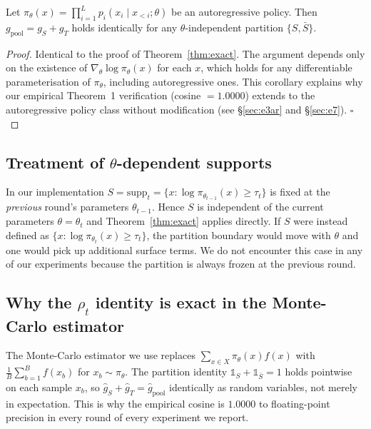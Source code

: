 \begin{corollary}
\label{cor:thm1ar}
Let $\pi_\theta(x) = \prod_{i=1}^L p_i(x_i \mid x_{<i};\theta)$ be an
autoregressive policy. Then $g_{\mathrm{pool}} = g_S + g_T$ holds
identically for any $\theta$-independent partition $\{S, \bar S\}$.
\end{corollary}

\begin{proof}
Identical to the proof of Theorem~\ref{thm:exact}. The argument depends only on the existence of $\nabla_\theta \log \pi_\theta(x)$ for each $x$, which holds for any differentiable parameterisation of $\pi_\theta$, including autoregressive ones. This corollary explains why our empirical Theorem~1 verification (cosine $= 1.0000$) extends to the autoregressive policy class without modification (see §\ref{sec:e3ar} and §\ref{sec:e7}).
\hfill$\square$
\end{proof}

\subsection{Treatment of $\theta$-dependent supports}
\label{app:thm1_sthet}

In our implementation $S = \mathrm{supp}_t = \{x : \log \pi_{\theta_{t-1}}(x) \geq \tau_t\}$ is fixed at the \emph{previous} round's parameters $\theta_{t-1}$. Hence $S$ is independent of the current parameters $\theta = \theta_t$ and Theorem~\ref{thm:exact} applies directly. If $S$ were instead defined as $\{x : \log \pi_{\theta_t}(x) \geq \tau_t\}$, the partition boundary would move with $\theta$ and one would pick up additional surface terms. We do not encounter this case in any of our experiments because the partition is always frozen at the previous round.

\subsection{Why the $\rho_t$ identity is exact in the Monte-Carlo estimator}

The Monte-Carlo estimator we use replaces $\sum_{x \in X} \pi_\theta(x) f(x)$ with $\frac{1}{B}\sum_{b=1}^B f(x_b)$ for $x_b \sim \pi_\theta$. The partition identity $\mathbb{1}_S + \mathbb{1}_{\bar S} = 1$ holds pointwise on each sample $x_b$, so $\hat g_S + \hat g_T = \hat g_{\mathrm{pool}}$ identically as random variables, not merely in expectation. This is why the empirical cosine is $1.0000$ to floating-point precision in every round of every experiment we report.

